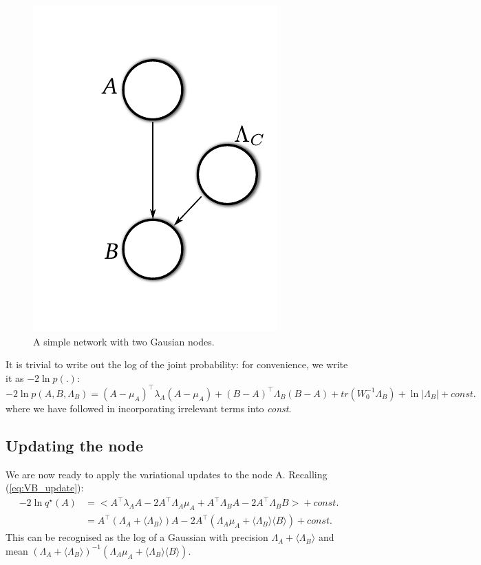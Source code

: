 \documentclass{article}
\newcommand{\const}{\textit{const.}}
\newcommand{\tr}{\textit{tr}}
\newcommand{\qs}{q^\star}
\newcommand{\<}{\langle}
\renewcommand{\>}{\rangle}
\begin{document}
\begin{figure}
\centering
\includegraphics{images/simple_DAG}
\caption{A simple network with two Gausian nodes.}
\label{fig:simple_DAG}
\end{figure}

It is trivial to write out the log of the joint probability: for convenience, we write it as $-2 \ln p(.)$:
\begin{equation}
-2 \ln p(A,B,\Lambda_B) = (A-\mu_A)^\top\lambda_A(A-\mu_A) + (B-A)^\top\Lambda_B(B-A) + \tr (W_0^{-1}\Lambda_B) + \ln|\Lambda_B| + \const
\end{equation}
where we have followed \cite{Bishop2006prm} in incorporating irrelevant terms into {\em const}.  

\subsection{Updating the node}
We are now ready to apply the variational updates to the node A. Recalling (\ref{eq:VB_update}):
\begin{equation}
\begin{split}
-2 \ln \qs (A) &= \big< A^\top\lambda_A A -2A^\top\Lambda_A\mu_A + A^\top\Lambda_B A  - 2A^\top \Lambda_B B \big> + \const\\
 &= A^\top(\Lambda_A + \<\Lambda_B\>)A -2A^\top(\Lambda_A\mu_A + \<\Lambda_B\> \<B\>) + \const
\end{split}
\end{equation}
This can be recognised as the log of a Gaussian with precision $\Lambda_A + \<\Lambda_B\>$ and mean $(\Lambda_A + \<\Lambda_B\>)^{-1}(\Lambda_A\mu_A + \<\Lambda_B\> \<B\>)$. 
\end{document}
